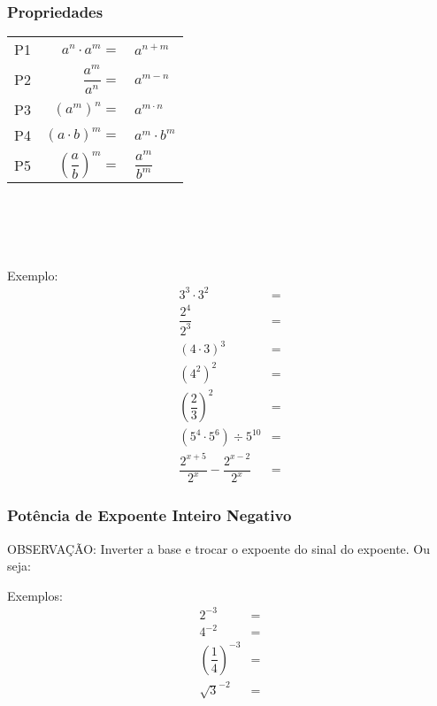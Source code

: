 \subsubsection{Propriedades}

\begin{tabular}{lrl}

 P1 & $a^n \cdot a^m=$ &$a^{n+m}$ \\

 P2 & $\dfrac{a^m}{a^n}=$ &$a^{m-n}$\\

 P3 & $(a^m)^n=$&$a^{m\cdot n}$ \\

 P4 & $ (a \cdot b)^m =$&$a^m \cdot b^m $ \\

 P5 & $ \left( \dfrac{a}{b} \right )^m =$&$ \dfrac{a^m}{b^m}$\\

\end{tabular}
\\\\\\\\
Exemplo:
\begin{align*}
 3^3 \cdot 3^2&=\\
 \dfrac{2^4}{2^3}&=\\
 (4 \cdot 3)^3&=\\
 (4^2)^2&=\\
 \left( \dfrac{2}{3} \right)^2&=\\
 (5^4 \cdot 5^6)\div 5^{10}&=\\
 \dfrac{2^{x+5}}{2^x}-\dfrac{2^{x-2}}{2^x}&=
\end{align*}

\subsubsection{Potência de Expoente Inteiro Negativo}

OBSERVAÇÃO: Inverter a base e trocar o expoente do sinal do expoente. Ou seja:
\begin{center}
\end{center}

Exemplos:
\begin{align*}
 2^{-3}&=\\
 4^{-2}&=\\
 \left(\dfrac{1}{4} \right)^{-3}&=\\
 \sqrt{3}^{-2}&=\\
\end{align*}

